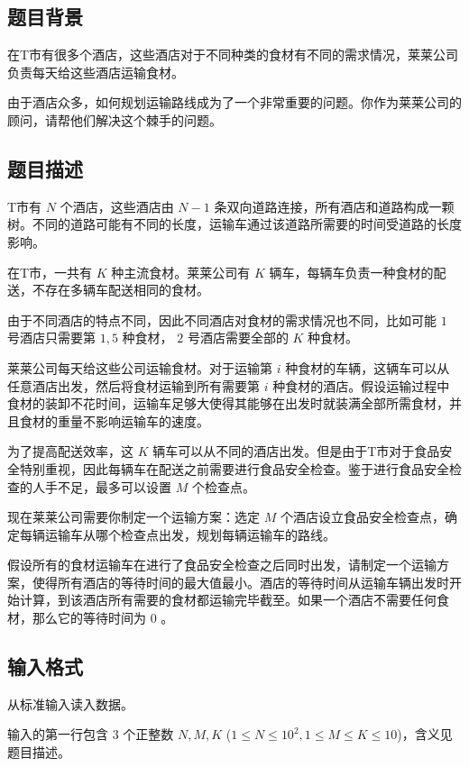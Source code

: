 \subsection*{题目背景}

在T市有很多个酒店，这些酒店对于不同种类的食材有不同的需求情况，莱莱公司负责每天给这些酒店运输食材。

由于酒店众多，如何规划运输路线成为了一个非常重要的问题。你作为莱莱公司的顾问，请帮他们解决这个棘手的问题。


\subsection*{题目描述}

T市有 $N$ 个酒店，这些酒店由 $N-1$ 条双向道路连接，所有酒店和道路构成一颗树。不同的道路可能有不同的长度，运输车通过该道路所需要的时间受道路的长度影响。

在T市，一共有 $K$ 种主流食材。莱莱公司有 $K$ 辆车，每辆车负责一种食材的配送，不存在多辆车配送相同的食材。

由于不同酒店的特点不同，因此不同酒店对食材的需求情况也不同，比如可能 $1$ 号酒店只需要第 $1,5$ 种食材， $2$ 号酒店需要全部的 $K$ 种食材。

莱莱公司每天给这些公司运输食材。对于运输第 $i$ 种食材的车辆，这辆车可以从任意酒店出发，然后将食材运输到所有需要第 $i$ 种食材的酒店。假设运输过程中食材的装卸不花时间，运输车足够大使得其能够在出发时就装满全部所需食材，并且食材的重量不影响运输车的速度。

为了提高配送效率，这 $K$ 辆车可以从不同的酒店出发。但是由于T市对于食品安全特别重视，因此每辆车在配送之前需要进行食品安全检查。鉴于进行食品安全检查的人手不足，最多可以设置 $M$ 个检查点。

现在莱莱公司需要你制定一个运输方案：选定{} $M$ 个酒店设立食品安全检查点，确定每辆运输车从哪个检查点出发，规划每辆运输车的路线。

假设所有的食材运输车在进行了食品安全检查之后同时出发，请制定一个运输方案，使得所有酒店的等待时间的最大值最小。酒店的等待时间从运输车辆出发时开始计算，到该酒店所有需要的食材都运输完毕截至。如果一个酒店不需要任何食材，那么它的等待时间为 $0$ 。


\subsection*{输入格式}

从标准输入读入数据。

输入的第一行包含 $3$ 个正整数 $N,M,K$ ($1 \le N \le 10^{2}, 1 \le M \le K \le 10$)，含义见题目描述。

